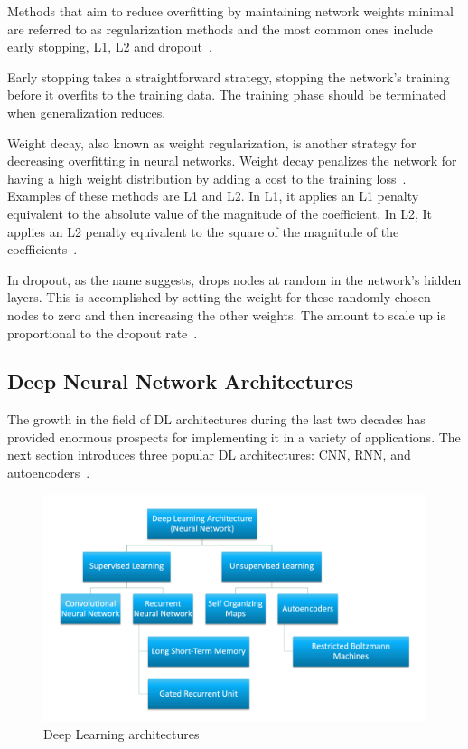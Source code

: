 Methods that aim to reduce overfitting by maintaining network weights minimal are referred to as regularization methods and the most common ones include early stopping, L1, L2 and dropout~\cite{Brownlee2019HowNetworks}.

Early stopping takes a straightforward strategy, stopping the network's training before it overfits to the training data. The training phase should be terminated when generalization reduces.

Weight decay, also known as weight regularization, is another strategy for decreasing overfitting in neural networks. Weight decay penalizes the network for having a high weight distribution by adding a cost to the training loss~\cite{Brownlee2019HowNetworks}. Examples of these methods are L1 and L2. In L1, it applies an L1 penalty equivalent to the absolute value of the magnitude of the coefficient. In L2, It applies an L2 penalty equivalent to the square of the magnitude of the coefficients~\cite{Tyagi2021L2Learning}.

In dropout, as the name suggests, drops nodes at random in the network's hidden layers. This is accomplished by setting the weight for these randomly chosen nodes to zero and then increasing the other weights. The amount to scale up is proportional to the dropout rate~\cite{Brownlee2019HowNetworks}.

\subsection{Deep Neural Network Architectures}

The growth in the field of \gls{DL} architectures during the last two decades has provided enormous prospects for implementing it in a variety of applications. The next section introduces three popular \gls{DL} architectures: \gls{CNN}, \gls{RNN}, and autoencoders~\cite{Ganatra2018ATools,Madhavan2021DeepDeveloper}.

\begin{figure}[htbp]
    \centering
    \includegraphics[width=\linewidth]{Chapters/Figures/DL-arch.png}
    \caption{Deep Learning architectures~\cite{Madhavan2021DeepDeveloper}}
    \label{fig:DL-arch}
\end{figure}

